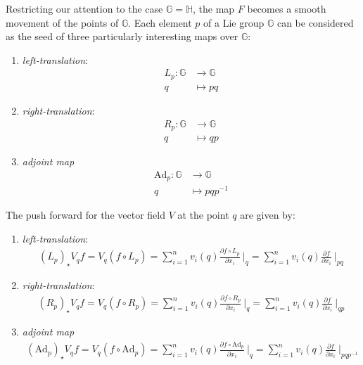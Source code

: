 \noindent
Restricting our attention to the case $\mathbb{G}=\mathbb{H}$, the map $F$ becomes a smooth movement of the points of $\mathbb{G}$.
Each element $p$ of a Lie group $\mathbb{G}$ can be considered as the seed of three particularly interesting maps over $\mathbb{G}$:
\begin{enumerate}
	\item \emph{left-translation}:
	\begin{align*}
	L_{p}: \mathbb{G} & \longrightarrow  \mathbb{G} \\
	q &\longmapsto pq
	\end{align*}
	\item \emph{right-translation}:
	\begin{align*}
	R_{p}: \mathbb{G} & \longrightarrow  \mathbb{G}\\
	q &\longmapsto qp
	\end{align*}
	\item \emph{adjoint map} 
	\begin{align*}
	\text{Ad}_{p}: \mathbb{G} & \longrightarrow  \mathbb{G} \\
	q &\longmapsto pqp^{-1}
	\end{align*}
\end{enumerate}
The push forward for the vector field $V$ at the point $q$ are given by:
\begin{enumerate}
	\item \emph{left-translation}:
	\begin{align*}
	(L_{p})_{\star}V_{q}f 
	=
	V_{q}(f\circ L_{p}) 
	=
	\sum_{i=1}^{n} v_{i}(q) \frac{\partial f \circ L_{p}}{\partial x_{i}} ~\Bigr|_{q} 
	=   
	\sum_{i=1}^{n} v_{i}(q) \frac{\partial f }{\partial x_{i}} ~\Bigr|_{pq} 
	\end{align*}
	\item \emph{right-translation}:
	\begin{align*}
	(R_{p})_{\star}V_{q}f 
	=
	V_{q}(f\circ R_{p}) 
	=
	\sum_{i=1}^{n} v_{i}(q) \frac{\partial f \circ R_{p}}{\partial x_{i}} ~\Bigr|_{q} 
	=   
	\sum_{i=1}^{n} v_{i}(q) \frac{\partial f }{\partial x_{i}} ~\Bigr|_{qp} 
	\end{align*}
	\item \emph{adjoint map} 
	\begin{align*}
	(\text{Ad}_{p})_{\star}V_{q}f 
	=
	V_{q}(f\circ \text{Ad}_{p}) 
	=
	\sum_{i=1}^{n} v_{i}(q) \frac{\partial f \circ \text{Ad}_{p}}{\partial x_{i}} ~\Bigr|_{q} 
	=   
	\sum_{i=1}^{n} v_{i}(q) \frac{\partial f }{\partial x_{i}} ~\Bigr|_{pqp^{-1}} 
	\end{align*}
\end{enumerate}
